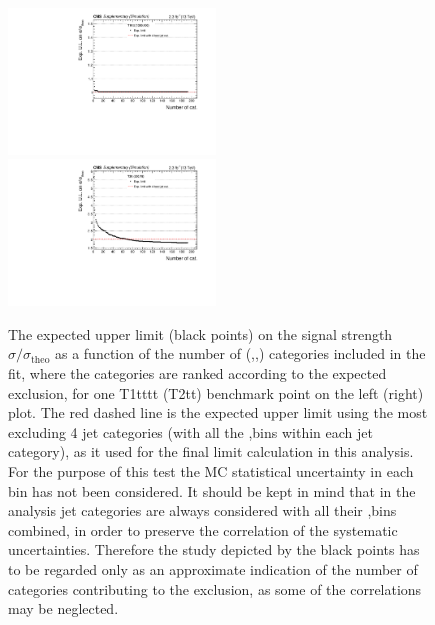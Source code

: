 \clearpage
\begin{figure}[t]
  \begin{center}
    \includegraphics[width=0.49\textwidth]{supplementary/figures/expVsCat_SMS-T1tttt_mGluino-1300_mLSP-100_25ns} \, 
    \includegraphics[width=0.49\textwidth]{supplementary/figures/expVsCat_SMS-T2tt_mStop-250_mLSP-75_25ns} \,     
  \end{center}
  \caption{
  The expected upper limit (black points) on the signal strength $\sigma/\sigma_{\mathrm{theo}}$ as a function of the number of 
  (\nj,\nb,\scalht) categories included in the fit, where the categories are ranked according to the expected exclusion, 
  for one T1tttt (T2tt) benchmark point on the left (right) plot. 
  The red dashed line is the expected upper limit using the most excluding 4 jet categories (with all the \nb,\scalht bins within each jet category), 
  as it used for the final limit calculation in this analysis. 
  For the purpose of this test the MC statistical uncertainty in each bin has not been considered. 
  It should be kept in mind that in the analysis jet categories are always considered with all their \nb,\scalht bins 
  combined, in order to preserve the correlation of the systematic uncertainties. 
  Therefore the study depicted by the black points has to be regarded only as an approximate indication 
  of the number of categories contributing to the exclusion, as some of the correlations may be neglected.
  \label{fig:sensitivityVsCat}}
\end{figure}




